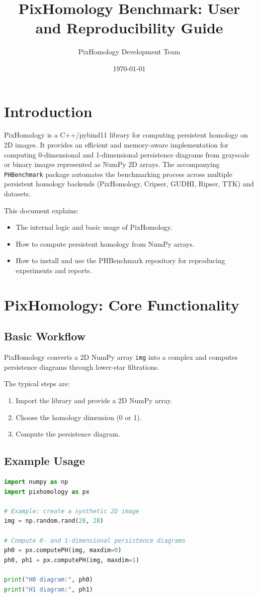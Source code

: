 \documentclass[a4paper,11pt]{article}
\title{\textbf{PixHomology Benchmark: User and Reproducibility Guide}}
\author{PixHomology Development Team}
\date{\today}
\begin{document}
\maketitle

\tableofcontents
\newpage

\section{Introduction}
PixHomology is a C++/pybind11 library for computing persistent homology on 2D images. It provides an efficient and memory-aware implementation for computing 0-dimensional and 1-dimensional persistence diagrams from grayscale or binary images represented as NumPy 2D arrays. The accompanying \texttt{PHBenchmark} package automates the benchmarking process across multiple persistent homology backends (PixHomology, Cripser, GUDHI, Ripser, TTK) and datasets.

This document explains:
\begin{itemize}
    \item The internal logic and basic usage of PixHomology.
    \item How to compute persistent homology from NumPy arrays.
    \item How to install and use the PHBenchmark repository for reproducing experiments and reports.
\end{itemize}

\section{PixHomology: Core Functionality}

\subsection{Basic Workflow}
PixHomology converts a 2D NumPy array \texttt{img} into a complex and computes persistence diagrams through lower-star filtrations.

The typical steps are:
\begin{enumerate}
    \item Import the library and provide a 2D NumPy array.
    \item Choose the homology dimension (0 or 1).
    \item Compute the persistence diagram.
\end{enumerate}

\subsection{Example Usage}
\begin{lstlisting}[language=Python, caption=Basic persistent homology computation using PixHomology]
import numpy as np
import pixhomology as px

# Example: create a synthetic 2D image
img = np.random.rand(28, 28)

# Compute 0- and 1-dimensional persistence diagrams
ph0 = px.computePH(img, maxdim=0)
ph0, ph1 = px.computePH(img, maxdim=1)

print("H0 diagram:", ph0)
print("H1 diagram:", ph1)
\end{lstlisting}
\end{document}
